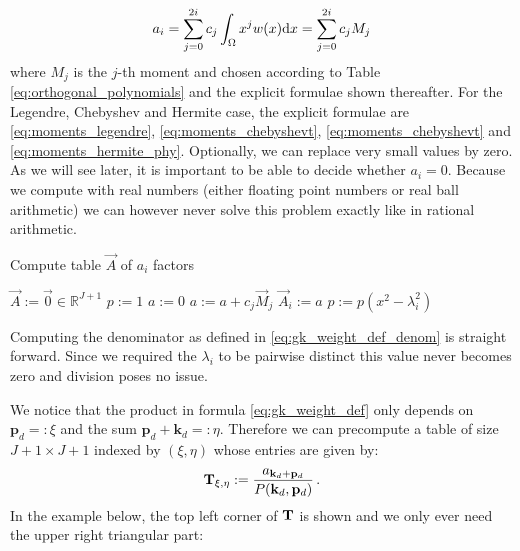 \documentclass[a4paper,10pt]{article}
\begin{document}
\begin{equation}
  a_i = \sum_{j=0}^{2i} c_j \int_\Omega x^j w(x) \mathrm{d}x = \sum_{j=0}^{2i} c_j M_j
\end{equation}
where $M_j$ is the $j$-th moment and chosen according to Table
\eqref{eq:orthogonal_polynomials} and the explicit formulae shown thereafter.
For the Legendre, Chebyshev and Hermite case, the explicit formulae are
\eqref{eq:moments_legendre}, \eqref{eq:moments_chebyshevt}, \eqref{eq:moments_chebyshevt}
and \eqref{eq:moments_hermite_phy}.
Optionally, we can replace very small values by zero. As we will see later,
it is important to be able to decide whether $a_{i} = 0$. Because we
compute with real numbers (either floating point numbers or real ball arithmetic)
we can however never solve this problem exactly like in rational arithmetic.

\begin{algorithm}[h!]
  \caption{Compute table $\vec{A}$ of $a_{i}$ factors}
  \label{alg:gk_compute_a_values}
  \begin{algorithmic}
      \State $\vec{A} := \vec{0} \in \mathbb{R}^{J+1}$
      \State $p := 1$
        \State $a := 0$
          \State $a := a + c_j \vec{M}_j$
        \EndFor
        \State $\vec{A}_i := a$
        \State $p := p \left(x^2 - \lambda_i^2\right)$
      \EndFor
    \EndProcedure
  \end{algorithmic}
\end{algorithm}

Computing the denominator as defined in \eqref{eq:gk_weight_def_denom}
is straight forward. Since we required the $\lambda_i$ to be pairwise
distinct this value never becomes zero and division poses no issue.

We notice that the product in formula \eqref{eq:gk_weight_def} only depends on
$\mathbf{p}_{d} =: \xi$ and the sum $\mathbf{p}_{d}+\mathbf{k}_{d} =: \eta$.
Therefore we can precompute a table of size $J+1 \times J+1$ indexed by $(\xi, \eta)$
whose entries are given by:
\begin{equation}
  \mathbf{T}_{\xi, \eta} := \frac{a_{\mathbf{k}_{d}+\mathbf{p}_{d}}}{P(\mathbf{k}_{d},\mathbf{p}_{d})} \,.
\end{equation}
In the example below, the top left corner of $\mathbf{T}$ is shown and we only
ever need the upper right triangular part:
\end{document}
